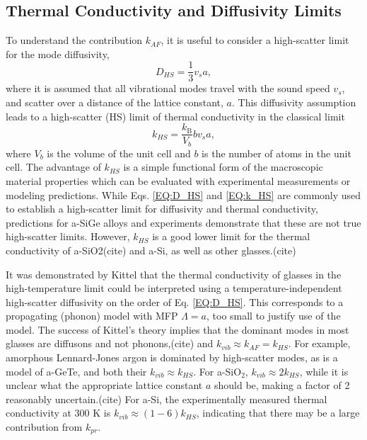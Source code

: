 \documentclass[aps,prb,onecolumn,preprint,superscriptaddress,footinbib,amsmath,amssymb,floatfix]{revtex4}
\begin{document}
\subsection{\label{S:Limits}Thermal Conductivity and Diffusivity Limits}

To understand the contribution $k_{AF}$, it is useful to consider a 
high-scatter limit for the mode diffusivity,
\begin{equation}\label{EQ:D_HS}
D_{HS} = \frac{1}{3} v_s a,
\end{equation}
where it is assumed that all vibrational modes travel with the sound speed  
$v_s$, and scatter over a distance of the lattice constant, $a$. This 
diffusivity assumption leads to a high-scatter (HS) limit of thermal 
conductivity in the classical limit\cite{cahill_lattice_1988} 
\begin{equation}\label{EQ:k_HS}
k_{HS} = \frac{k_{\text{B}}}{V_b}b v_s a,
\end{equation}
where $V_b$ is the volume of the unit cell and $b$ is the number of atoms 
in the unit cell.\cite{cahill_lower_1992} 
The advantage of $k_{HS}$ is a simple 
functional form of the macroscopic material properties which can 
be evaluated with experimental measurements or modeling predictions. 
While Eqs. \eqref{EQ:D_HS} and \eqref{EQ:k_HS} are commonly used to 
establish a high-scatter limit for 
diffusivity and thermal conductivity, predictions for a-SiGe alloys 
\cite{feldman_thermal_1993} and experiments 
demonstrate that these are not true high-scatter limits.  
However, $k_{HS}$ is a good lower limit for the thermal conductivity 
of a-SiO2(cite) and a-Si, as well as other glasses.(cite)

It was demonstrated by Kittel that  
the thermal conductivity of glasses in the high-temperature limit could 
be interpreted 
using a temperature-independent high-scatter diffusivity on the order 
of Eq. \eqref{EQ:D_HS}.\cite{kittel_interpretation_1949}  
This corresponds to a propagating (phonon) model with MFP $\Lambda = a$, 
too small to justify use of the model. The success of Kittel's theory 
implies that the dominant 
modes in most glasses are diffusons and not phonons,(cite) and  
$k_{vib} \approx k_{AF} = k_{HS}$. 
For example, amorphous Lennard-Jones argon is dominated 
by high-scatter modes,\cite{larkin_predicting_2013} as is a model of 
a-GeTe,\cite{sosso_thermal_2012} and both their $k_{vib} \approx k_{HS}$. 
For a-SiO$_2$, $k_{vib} \approx 2k_{HS}$, while it is unclear what the 
appropriate lattice constant $a$ should be, making a factor of 
2 reasonably uncertain.(cite) 
For a-Si, the experimentally measured thermal conductivity at 
300 K is $k_{vib} \approx (1-6) k_{HS}$,\cite{cahill_lower_1992}  
indicating that there may be a large contribution from $k_{pr}$.
\end{document}
